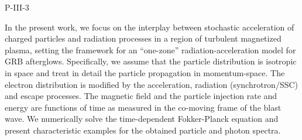 P-III-3


\bigskip



\bigskip

\noindent In the present work, we focus on the interplay between stochastic acceleration of charged particles and radiation processes in a region of turbulent magnetized plasma, setting the framework for an “one-zone” radiation-acceleration model for GRB afterglows. Specifically, we assume that the particle distribution is isotropic in space and treat in detail the particle propagation in momentum-space. The electron distribution is modified by the acceleration, radiation (synchrotron/SSC) and escape processes.  The magnetic field and the particle injection rate and energy are functions of  time as measured in the co-moving frame of the blast wave.  We numerically solve the time-dependent Fokker-Planck equation and present characteristic examples for the obtained particle and photon spectra.

